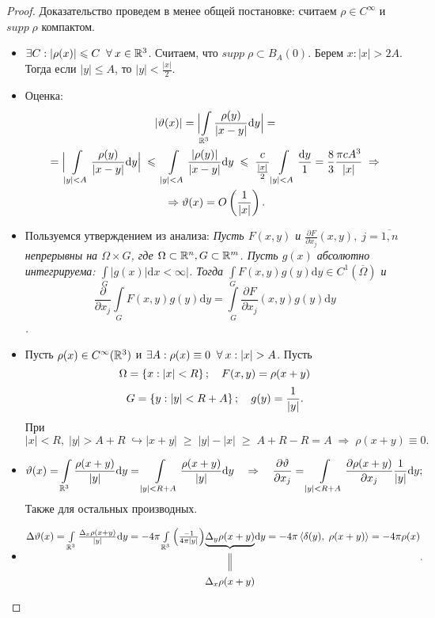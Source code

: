 \begin{proof}

Доказательство проведем в менее общей постановке: считаем $\rho \in C^\infty$ и $supp \;\rho$ компактом.

	\begin{itemize}
		\item $\exists C: |\rho (x)|\leqslant C \;\;\forall\:  x \in \mathbb{R}^3$. Считаем, что $supp \;\rho  \subset B_A(0)$. Берем $x: |x| > 2A$. Тогда если $|y| \leq A$, то $|y| < \frac{|x|}{2}$.
        \item Оценка:
        	\begin{multline*}
				\ |\vartheta (x)| = \Bigl | \int\limits_{\mathbb{R}^3} \frac{\rho (y)}{|x-y|}\mathrm{d}y \Bigr | = {}\\
                {} = \Bigl | \int\limits_{|y|<A} \frac{\rho (y)}{|x-y|}\mathrm{d}y \Bigr | \;\leqslant\; \int\limits_{|y|<A} \frac{|\rho (y)|}{|x-y|}\mathrm{d}y \;\leqslant\; \frac{c}{\frac{|x|}{2}}\int\limits_{|y|<A}\frac{\mathrm{d}y}{1} = \frac{8}{3}\frac{\pi c A^3}{|x|} \;\Rightarrow {}\\
                {} \Rightarrow \vartheta (x) = O \left(\frac{1}{|x|}\right).
			\end{multline*}
        \item Пользуемся утверждением из анализа: {\it Пусть $F(x,y)$ и $\frac{\partial F}{\partial x_j}(x,y), \; j= \overline{1,n}$ непрерывны на $\Omega \times G$, где $\Omega \subset  \mathbb{R}^n, G \subset \mathbb{R}^m$. Пусть $g(x)$ абсолютно интегрируема: $\int\limits_G |g(x)| \mathrm{d}x < \infty|$. Тогда $\int\limits_G F(x,y)g(y) \mathrm{d}y \in C^1(\overline{\Omega})$ и
        $$
        \frac{\partial}{\partial x_j}\int\limits_G F(x,y)g(y)\mathrm{d}y = \int\limits_G \frac{\partial F}{\partial x_j}(x,y)g(y)\mathrm{d}y 
        $$.}
        \item Пусть $\rho (x) \in C^\infty (\mathbb{R}^3)$ и $\exists A: \rho (x) \equiv 0 \;\;\forall\: x: |x| > A$. Пусть 
        $$\Omega = \left\{x: |x| < R\right\};\quad F(x,y) = \rho (x+y)$$
        $$G = \left\{y: |y| < R+A\right\};\quad g(y) = \frac{1}{|y|}.$$
        При $|x| < R,\; |y| > A+R \; \hookrightarrow |x+y| \;\geq\; |y| - |x| \;\geq\; A+R -R = A \;\Rightarrow \; \rho (x+y) \equiv 0. $
        \item 
        $$
        \vartheta (x) = \int\limits_{\mathbb{R}^3}\frac{\rho (x+y)}{|y|}\mathrm{d} y = \int\limits_{|y| < R+A}\frac{\rho (x+y)}{|y|}\mathrm{d} y \quad \Rightarrow\quad \frac{\partial \vartheta}{\partial x_j} = \int\limits_{|y| < R+A}\frac{\partial \rho (x+y)}{\partial x_j}\frac{1}{|y|}\mathrm{d} y
        ;$$ Также для остальных производных.
        \item 
        $$
        \begin{CD}
          \Delta \vartheta (x) = \int\limits_{\R^3}\frac{\Delta_x \rho (x+y)}{|y|}\mathrm{d}y = -4\pi \int\limits_{\R^3}\roundBr{\frac{-1}{4\pi |y|}} @. \underbrace{\Delta_y \rho (x+y)} @.\mathrm{d}y = -4\pi \angleBr{\delta(y),\; \rho (x+y)} = -4\pi \rho (x) \\
          @.   @|   @.\\
          @.   {\Delta_x \rho (x+y)}   @.
        \end{CD}
        .$$
	\end{itemize}

\end{proof}